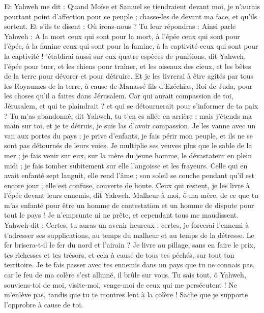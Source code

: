 \begin{multicols}{2}
\VerseOne{}Et Yahweh me dit : Quand Moïse et Samuel se tiendraient devant moi, je n'aurais pourtant point d'affection pour ce peuple ; chasse-les de devant ma face, et qu'ils sortent.
Et s'ils te disent : Où irons-nous ? Tu leur répondras : Ainsi parle Yahweh : A la mort ceux qui sont pour la mort, à l'épée ceux qui sont pour l'épée, à la famine ceux qui sont pour la famine, à la captivité ceux qui sont pour la captivité !
'établirai aussi sur eux quatre espèces de punitions, dit Yahweh, l'épée pour tuer, et les chiens pour traîner, et les oiseaux des cieux, et les bêtes de la terre pour dévorer et pour détruire. 
Et je les livrerai à être agités par tous les Royaumes de la terre, à cause de Manassé fils d'Ezéchias, Roi de Juda, pour les choses qu'il a faites dans Jérusalem. 
Car qui aurait compassion de toi, Jérusalem, et qui te plaindrait ? et qui se détournerait pour s'informer de ta paix ? 
Tu m'as abandonné, dit Yahweh, tu t'en es allée en arrière ; mais j'étends ma main sur toi, et je te détruis, je suis las d'avoir compassion.
Je les vanne avec un van aux portes du pays ; je prive d'enfants, je fais périr mon peuple, et ils ne se sont pas détournés de leurs voies.
Je multiplie ses veuves plus que le sable de la mer ; je fais venir sur eux, sur la mère du jeune homme, le dévastateur en plein midi ; je fais tomber subitement sur elle l'angoisse et les frayeurs.
Celle qui en avait enfanté sept languit, elle rend l'âme ; son soleil se couche pendant qu'il est encore jour ; elle est confuse, couverte de honte. Ceux qui restent, je les livre à l'épée devant leurs ennemis, dit Yahweh.
Malheur à moi, ô ma mère, de ce que tu m'as enfanté pour être un homme de contestation et un homme de dispute pour tout le pays ! Je n'emprunte ni ne prête, et cependant tous me maudissent.
Yahweh dit : Certes, tu auras un avenir heureux ; certes, je forcerai l'ennemi à t'adresser ses supplications, au temps du malheur et au temps de la détresse.
Le fer brisera-t-il le fer du nord et l'airain ?
Je livre au pillage, sans en faire le prix, tes richesses et tes trésors, et cela à cause de tous tes péchés, sur tout ton territoire.
Je te fais passer avec tes ennemis dans un pays que tu ne connais pas, car le feu de ma colère s'est allumé, il brûle sur vous.
Tu sais tout, ô Yahweh, souviens-toi de moi, visite-moi, venge-moi de ceux qui me persécutent ! Ne m'enlève pas, tandis que tu te montres lent à la colère ! Sache que je supporte l'opprobre à cause de toi.

\end{multicols}
